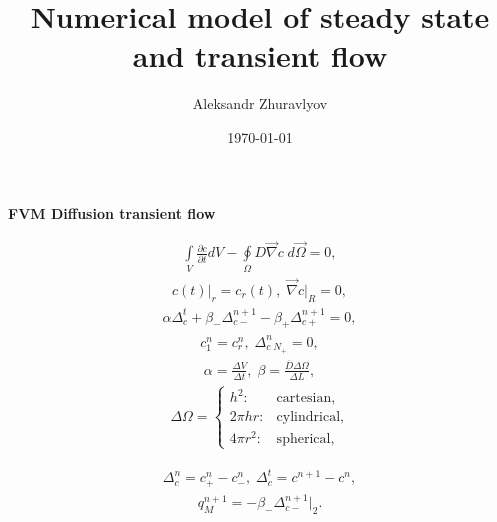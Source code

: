 \documentclass[a4paper,12pt]{extreport}
\author{Aleksandr Zhuravlyov}
\title{Numerical model of steady state and transient flow}
\date{\today}
\begin{document}
    \pagecolor{pageColor}
    \color{fontColor}

        \begin{center}
        {\large \textbf{FVM Diffusion transient flow}}
        \end{center}
          \begin{eqnarray}
            \label{eq:conductivity_integral}
            \int \limits_{V} \frac{\partial c}{\partial t} d V - \oint \limits_{\Omega} D \vec{\nabla}c \; d\vec{\Omega} = 0,
        \end{eqnarray}
        \vspace{-0.5cm}
         \begin{eqnarray}
            \label{eq:conductivity_bound}
            c\left(t\right) \Big|_{r} = c_r\left(t\right), \;
            \vec{\nabla} c \Big|_{R} = 0,
        \end{eqnarray}
               \begin{eqnarray}
            \label{eq:conductivity_num}
            \alpha \Delta^{t}_{c} + \beta_{-}\Delta^{n+1}_{c-} - \beta_{+}\Delta^{n+1}_{c+}= 0,
        \end{eqnarray}
         \begin{eqnarray}
            \label{eq:conductivity_bound_num}
            c_1^n = c_r^n, \;
           \Delta_{c \; N_+}^n = 0,
        \end{eqnarray}
         \begin{eqnarray}
            \label{eq:alpha_beta}
            \alpha = \frac{\Delta V}{\Delta t}, \;
			\beta = \frac{\overline{D} \Delta \Omega}{\Delta L},
        \end{eqnarray}
        \begin{eqnarray}
  			\Delta \Omega =\begin{cases}
    		h^2: & \text{cartesian},\\
    		2 \pi h r: & \text{cylindrical},\\
    		4 \pi r^2: & \text{spherical},
  			\end{cases}
		\end{eqnarray}

        \begin{eqnarray}
            \label{eq:delta_num}
            \Delta_{c}^n = c_{+}^n - c_{-}^n, \;
            \Delta^{t}_{c} = c^{n+1} - c^{n},
        \end{eqnarray}
        \begin{eqnarray}
            \label{eq:Consumption_conductivity_integral}
            q_{M}^{n+1} = - \beta_-\Delta^{n+1}_{c-} \Big|_ {2}.                        
        \end{eqnarray}
\end{document}
